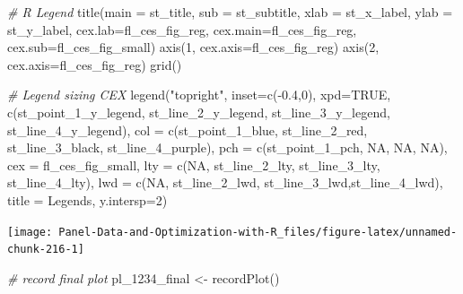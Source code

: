 \documentclass[
]{book}
\newenvironment{Shaded}{\begin{snugshade}}{\end{snugshade}}
\newcommand{\AttributeTok}[1]{\textcolor[rgb]{0.77,0.63,0.00}{#1}}
\newcommand{\CommentTok}[1]{\textcolor[rgb]{0.56,0.35,0.01}{\textit{#1}}}
\newcommand{\ConstantTok}[1]{\textcolor[rgb]{0.00,0.00,0.00}{#1}}
\newcommand{\DecValTok}[1]{\textcolor[rgb]{0.00,0.00,0.81}{#1}}
\newcommand{\FloatTok}[1]{\textcolor[rgb]{0.00,0.00,0.81}{#1}}
\newcommand{\FunctionTok}[1]{\textcolor[rgb]{0.00,0.00,0.00}{#1}}
\newcommand{\NormalTok}[1]{#1}
\newcommand{\OtherTok}[1]{\textcolor[rgb]{0.56,0.35,0.01}{#1}}
\newcommand{\SpecialCharTok}[1]{\textcolor[rgb]{0.00,0.00,0.00}{#1}}
\newcommand{\StringTok}[1]{\textcolor[rgb]{0.31,0.60,0.02}{#1}}
\begin{document}
\begin{Shaded}
\begin{Highlighting}[]
\CommentTok{\# R Legend}
\FunctionTok{title}\NormalTok{(}\AttributeTok{main =}\NormalTok{ st\_title, }\AttributeTok{sub =}\NormalTok{ st\_subtitle, }\AttributeTok{xlab =}\NormalTok{ st\_x\_label, }\AttributeTok{ylab =}\NormalTok{ st\_y\_label,}
      \AttributeTok{cex.lab=}\NormalTok{fl\_ces\_fig\_reg,}
      \AttributeTok{cex.main=}\NormalTok{fl\_ces\_fig\_reg,}
      \AttributeTok{cex.sub=}\NormalTok{fl\_ces\_fig\_small)}
\FunctionTok{axis}\NormalTok{(}\DecValTok{1}\NormalTok{, }\AttributeTok{cex.axis=}\NormalTok{fl\_ces\_fig\_reg)}
\FunctionTok{axis}\NormalTok{(}\DecValTok{2}\NormalTok{, }\AttributeTok{cex.axis=}\NormalTok{fl\_ces\_fig\_reg)}
\FunctionTok{grid}\NormalTok{()}

\CommentTok{\# Legend sizing CEX}
\FunctionTok{legend}\NormalTok{(}\StringTok{"topright"}\NormalTok{,}
       \AttributeTok{inset=}\FunctionTok{c}\NormalTok{(}\SpecialCharTok{{-}}\FloatTok{0.4}\NormalTok{,}\DecValTok{0}\NormalTok{),}
       \AttributeTok{xpd=}\ConstantTok{TRUE}\NormalTok{,}
       \FunctionTok{c}\NormalTok{(st\_point\_1\_y\_legend, st\_line\_2\_y\_legend, st\_line\_3\_y\_legend, st\_line\_4\_y\_legend),}
       \AttributeTok{col =} \FunctionTok{c}\NormalTok{(st\_point\_1\_blue, st\_line\_2\_red, st\_line\_3\_black, st\_line\_4\_purple),}
       \AttributeTok{pch =} \FunctionTok{c}\NormalTok{(st\_point\_1\_pch, }\ConstantTok{NA}\NormalTok{, }\ConstantTok{NA}\NormalTok{, }\ConstantTok{NA}\NormalTok{),}
       \AttributeTok{cex =}\NormalTok{ fl\_ces\_fig\_small,}
       \AttributeTok{lty =} \FunctionTok{c}\NormalTok{(}\ConstantTok{NA}\NormalTok{, st\_line\_2\_lty, st\_line\_3\_lty, st\_line\_4\_lty),}
       \AttributeTok{lwd =} \FunctionTok{c}\NormalTok{(}\ConstantTok{NA}\NormalTok{, st\_line\_2\_lwd, st\_line\_3\_lwd,st\_line\_4\_lwd),}
       \AttributeTok{title =} \StringTok{\textquotesingle{}Legends\textquotesingle{}}\NormalTok{,}
       \AttributeTok{y.intersp=}\DecValTok{2}\NormalTok{)}
\end{Highlighting}
\end{Shaded}

\begin{center}\texttt{[image: Panel-Data-and-Optimization-with-R\_files/figure-latex/unnamed-chunk-216-1]} \end{center}

\begin{Shaded}
\begin{Highlighting}[]
\CommentTok{\# record final plot}
\NormalTok{pl\_1234\_final }\OtherTok{\textless{}{-}} \FunctionTok{recordPlot}\NormalTok{()}
\end{Highlighting}
\end{Shaded}
\end{document}
